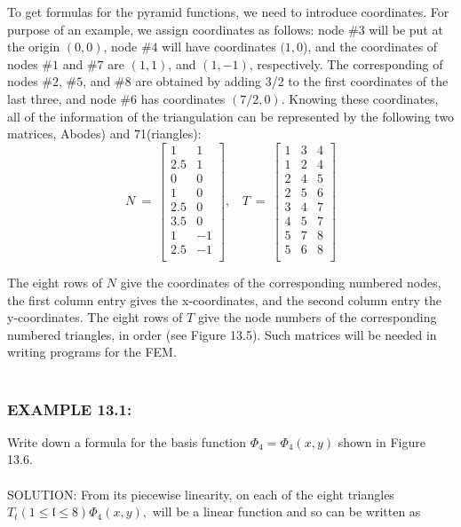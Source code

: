 \documentclass[../main.tex]{subfiles}
\begin{document}
To get formulas for the pyramid functions, we need to introduce coordinates. For  purpose of an example, we assign coordinates as follows: node $\#3$ will be put at the origin $(0,0)$, node $\#4$ will have coordinates $(1,0$), and the coordinates of nodes $\#1$ and $\#7$ are $(1,1)$, and $(1,-1)$, respectively. The corresponding  of nodes $\#2$, $\#5$, and $\#8$ are obtained by adding 3/2 to the first coordinates of the last three, and node $\#6$ has coordinates $(7/2,0)$. Knowing these coordinates, all of the information of the triangulation can be represented by the following two matrices, Abodes) and 71(riangles): 
$$
N~=~\begin{bmatrix} 
		  1&1\\
		  2.5&1\\
		  0&0\\
		  1&0\\
		  2.5&0\\
		  3.5&0\\
		  1&-1\\
		  2.5&-1\\
\end{bmatrix},
~~~~
T~=~\begin{bmatrix} 
		  1&3&4\\
		  1&2&4\\
		  2&4&5\\
		  2&5&6\\
		  3&4&7\\
		  4&5&7\\
		  5&7&8\\
		  5&6&8\\
\end{bmatrix}
$$

The eight rows of $N$ give the coordinates of the corresponding numbered nodes, the first column entry gives the x-coordinates, and the second column entry the y-coordinates. The eight rows of $T$ give the node numbers of the corresponding numbered triangles, in order (see Figure 13.5). Such matrices will be needed in writing programs for the FEM.
\\
\\
\subsubsection{EXAMPLE 13.1:}Write down a formula for the basis function $\Phi_4 =\Phi_4 (x,y)$ shown in Figure 13.6. 
\\
\\
SOLUTION: From its piecewise linearity, on each of the eight triangles $T_t (1\leqslant \mathfrak{l} \leqslant 8)\Phi_4(x,y), $ will be a linear function and so can be written as
\end{document}
